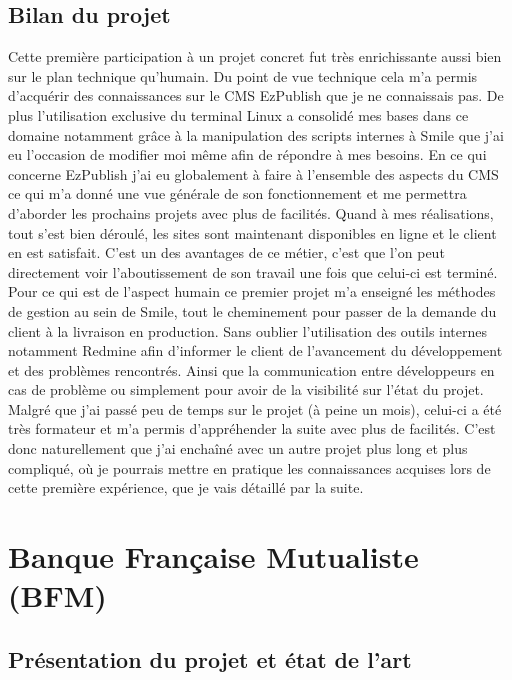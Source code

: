 \documentclass[a4paper,11pt,twoside]{report}
\begin{document}
    \subsection*{Bilan du projet}
    Cette première participation à un projet concret fut très enrichissante aussi bien sur le plan technique qu'humain. Du point de vue technique cela m'a permis d'acquérir des connaissances sur le CMS EzPublish que je ne connaissais pas. De plus l'utilisation exclusive du terminal Linux a consolidé mes bases dans ce domaine notamment grâce à la manipulation des scripts internes à Smile que j'ai eu l'occasion de modifier moi même afin de répondre à mes besoins. En ce qui concerne EzPublish j'ai eu globalement à faire à l'ensemble des aspects du CMS ce qui m'a donné une vue générale de son fonctionnement et me permettra d'aborder les prochains projets avec plus de facilités. Quand à mes réalisations, tout s'est bien déroulé, les sites sont maintenant disponibles en ligne et le client en est satisfait. C'est un des avantages de ce métier, c'est que l'on peut directement voir l'aboutissement de son travail une fois que celui-ci est terminé. Pour ce qui est de l'aspect humain ce premier projet m'a enseigné les méthodes de gestion au sein de Smile, tout le cheminement pour passer de la demande du client à la livraison en production. Sans oublier l'utilisation des outils internes notamment Redmine afin d'informer le client de l'avancement du développement et des problèmes rencontrés. Ainsi que la communication entre développeurs en cas de problème ou simplement pour avoir de la visibilité sur l'état du projet. Malgré que j'ai passé peu de temps sur le projet (à peine un mois), celui-ci a été très formateur et m'a permis d'appréhender la suite avec plus de facilités. C'est donc naturellement que j'ai enchaîné avec un autre projet plus long et plus compliqué, où je pourrais mettre en pratique les connaissances acquises lors de cette première expérience, que je vais détaillé par la suite.  
  \section{Banque Française Mutualiste (BFM)}
    \subsection*{Présentation du projet et état de l'art}
\end{document}
